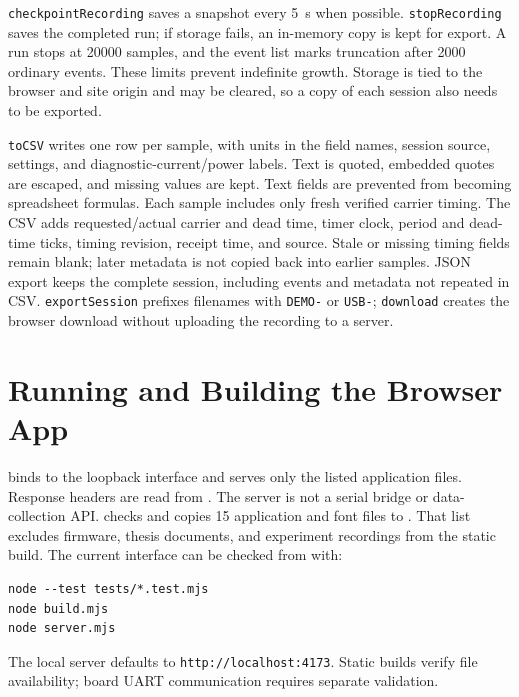 \texttt{checkpointRecording} saves a snapshot every \SI{5}{\second}
when possible. \texttt{stopRecording} saves the completed run;
if storage fails, an in-memory copy is kept for export. A run
stops at 20000 samples, and the event list marks truncation
after 2000 ordinary events. These limits prevent indefinite
growth. Storage is tied to the browser and site origin and
may be cleared, so a copy of each session also needs to be exported.

\texttt{toCSV} writes one row per sample, with units in the field
names, session source, settings, and diagnostic-current/power
labels. Text is quoted, embedded quotes are escaped, and missing values
are kept. Text fields are prevented from becoming spreadsheet formulas.
Each sample includes only fresh verified carrier timing. The CSV adds requested/actual carrier and dead time, timer clock, period and dead-time ticks, timing revision, receipt time, and source. Stale or missing timing fields remain blank; later metadata is not copied back into earlier samples. JSON export keeps the complete session, including events and metadata
not repeated in CSV. \texttt{exportSession} prefixes filenames
with \texttt{DEMO-} or \texttt{USB-}; \texttt{download} creates
the browser download without uploading the recording to a server.

\section{Running and Building the Browser App}
\label{sec:app-browser-build}

 binds to the loopback interface and serves only
the listed application files. Response headers are read from
. The server is not a serial bridge or data-collection
API.  checks and copies 15 application and font
files to . That list excludes firmware, thesis
documents, and experiment recordings from the static build. The current
interface can be checked from  with:

\begin{lstlisting}[caption={Commands to test, build, and serve the browser app.},label={lst:app-web-reproduce}]
node --test tests/*.test.mjs
node build.mjs
node server.mjs
\end{lstlisting}

The local server defaults to \texttt{http://localhost:4173}. Static builds verify file
availability; board UART communication requires separate validation.

